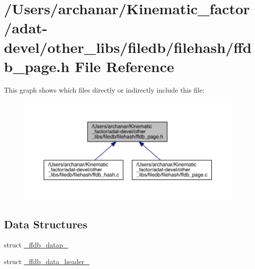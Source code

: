 \hypertarget{adat-devel_2other__libs_2filedb_2filehash_2ffdb__page_8h}{}\section{/\+Users/archanar/\+Kinematic\+\_\+factor/adat-\/devel/other\+\_\+libs/filedb/filehash/ffdb\+\_\+page.h File Reference}
\label{adat-devel_2other__libs_2filedb_2filehash_2ffdb__page_8h}
This graph shows which files directly or indirectly include this file\+:
\nopagebreak
\begin{figure}[H]
\begin{center}
\leavevmode
\includegraphics[width=350pt]{d4/d4e/adat-devel_2other__libs_2filedb_2filehash_2ffdb__page_8h__dep__incl}
\end{center}
\end{figure}
\subsection*{Data Structures}
\begin{DoxyCompactItemize}
\item 
struct \mbox{\hyperlink{struct__ffdb__datap__}{\+\_\+ffdb\+\_\+datap\+\_\+}}
\item 
struct \mbox{\hyperlink{struct__ffdb__data__header__}{\+\_\+ffdb\+\_\+data\+\_\+header\+\_\+}}
\end{DoxyCompactItemize}
